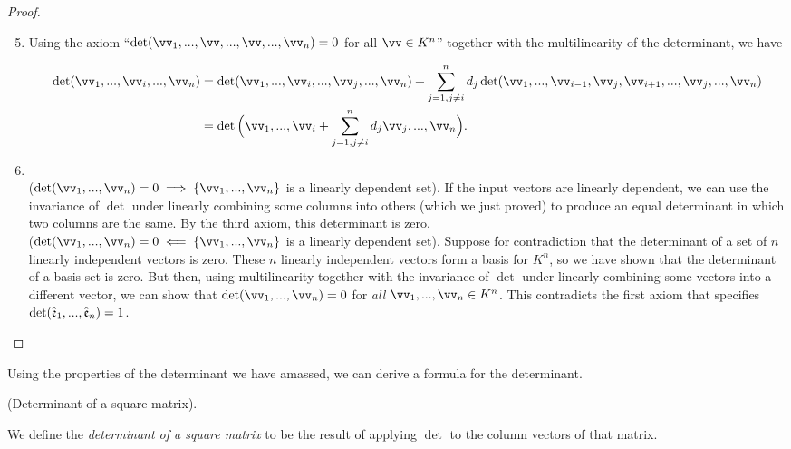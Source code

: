 \begin{proof}
    \mbox{} \\
    \begin{enumerate}
    \setcounter{enumi}{4}
        \item 
        
        Using the axiom ``$\det(\vv_1, ..., \vv, ..., \vv, ..., \vv_n) = 0$ for all $\vv \in K^n$'' together with the multilinearity of the determinant, we have
        
        \begin{align*}
            \det(\vv_1, ..., \vv_i, ..., \vv_n)
            &= \det(\vv_1, ..., \vv_i, ..., \vv_j, ..., \vv_n) + \sum_{j = 1, j \neq i}^n d_j \det(\vv_1, ..., \vv_{i - 1}, \vv_j, \vv_{i + 1}, ..., \vv_j, ..., \vv_n) \\
            &= \det\Big( \vv_1, ..., \vv_i + \sum_{j = 1, j \neq i}^n d_j \vv_j, ..., \vv_n \Big).
        \end{align*}
        
        \item 
        \mbox{}
        \\ \indent ($\det(\vv_1, ..., \vv_n) = 0 \implies \{\vv_1, ..., \vv_n\}$ is a linearly dependent set). If the input vectors are linearly dependent, we can use the invariance of $\det$ under linearly combining some columns into others (which we just proved) to produce an equal determinant in which two columns are the same. By the third axiom, this determinant is zero.
        \\ \indent ($\det(\vv_1, ..., \vv_n) = 0 \impliedby \{\vv_1, ..., \vv_n\}$ is a linearly dependent set). Suppose for contradiction that the determinant of a set of $n$ linearly independent vectors is zero. These $n$ linearly independent vectors form a basis for $K^n$, so we have shown that the determinant of a basis set is zero. But then, using multilinearity together with the invariance of $\det$ under linearly combining some vectors into a different vector, we can show that $\det(\vv_1, ..., \vv_n) = 0$ for \textit{all} $\vv_1, ..., \vv_n \in K^n$. This contradicts the first axiom that specifies $\det(\hat{\mathfrak{e}}_1, ..., \hat{\mathfrak{e}}_n) = 1$.
    \end{enumerate}
\end{proof}

Using the properties of the determinant we have amassed, we can derive a formula for the determinant.

\begin{defn}
    (Determinant of a square matrix). 
    
    We define the \textit{determinant of a square matrix} to be the result of applying $\det$ to the column vectors of that matrix.
\end{defn}

